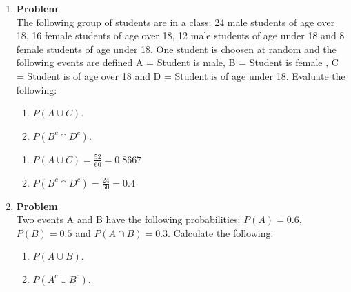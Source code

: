 \documentclass[12pt]{article}
\newenvironment{Ex}{\textbf{Problem}\vspace{.75em}\\}{}
\begin{document}
\begin{enumerate}
\begin{Ex}
\begin{solution}
\begin{figure}[hbt]
\begin{subfigure}[b]{0.45\textwidth}
          \resizebox{\textwidth}{!}{}
        \end{subfigure}
        \begin{subfigure}[b]{0.45\textwidth}
          \resizebox{\textwidth}{!}{}
        \end{subfigure}
        \begin{subfigure}[b]{0.45\textwidth}
          \resizebox{\textwidth}{!}{}
        \end{subfigure}
        \begin{subfigure}[b]{0.45\textwidth}
          \resizebox{\textwidth}{!}{}
        \end{subfigure}
        \caption{Plots for Problem 3}
        \label{fig:3-plots}
      \end{figure}
    \end{solution}
  \end{Ex}
\item 
  \begin{Ex}
    The following group of students are in a class: 24 male students
    of age over 18, 16 female students of age over 18, 12 male
    students of age under 18 and 8 female students of age under
    18. One student is choosen at random and the following events are
    defined A = Student is male, B = Student is female , C = Student is
    of age over 18 and D = Student is of age under 18. Evaluate the
    following:
    \begin{enumerate}
    \item $P(A \cup C)$.
    \item $P(B^c \cap D^c)$.
    \end{enumerate}
    \begin{solution} \hfill
      \begin{enumerate}
      \item $P(A \cup C) = \frac{52}{60} = 0.8667$
      \item $P(B^c \cap D^c) = \frac{24}{60} = 0.4$
      \end{enumerate}
    \end{solution}
  \end{Ex}
\item 
  \begin{Ex}
    Two events A and B have the following probabilities: $P(A) = 0.6$,
    $P(B) = 0.5$ and $P(A \cap B) = 0.3$. Calculate the following:
    \begin{enumerate}
    \item $P(A \cup B)$.
    \item $P(A^c \cup B^c)$.

\end{enumerate}
\end{Ex}
\end{enumerate}
\end{document}
